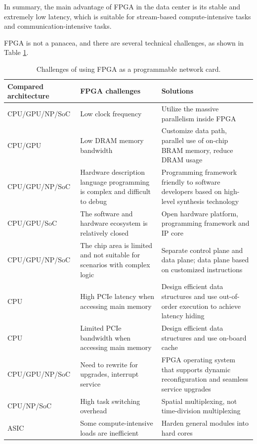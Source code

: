 In summary, the main advantage of FPGA in the data center is its stable and extremely low latency, which is suitable for stream-based compute-intensive tasks and communication-intensive tasks.

FPGA is not a panacea, and there are several technical challenges, as shown in Table \ref{background:tab:fpga-challenges}.

\begin{table}[htbp]
	\centering
	\caption{Challenges of using FPGA as a programmable network card.}
	\small
	\begin{tabular}{l|p{}|p{}}
		\hline
		Compared architecture & FPGA challenges & Solutions \\
		\hline
		\hline
		CPU/GPU/NP/SoC & Low clock frequency & Utilize the massive parallelism inside FPGA \\
		\hline 
		CPU/GPU & Low DRAM memory bandwidth & Customize data path, parallel use of on-chip BRAM memory, reduce DRAM usage \\
		\hline
		CPU/GPU/NP/SoC & Hardware description language programming is complex and difficult to debug & Programming framework friendly to software developers based on high-level synthesis technology \\
		\hline
		CPU/GPU/SoC & The software and hardware ecosystem is relatively closed & Open hardware platform, programming framework and IP core \\
		\hline
		CPU/GPU/NP/SoC & The chip area is limited and not suitable for scenarios with complex logic & Separate control plane and data plane; data plane based on customized instructions \\
		\hline
		CPU & High PCIe latency when accessing main memory & Design efficient data structures and use out-of-order execution to achieve latency hiding \\
		\hline
		CPU & Limited PCIe bandwidth when accessing main memory & Design efficient data structures and use on-board cache \\
		\hline
		CPU/GPU/NP/SoC & Need to rewrite for upgrades, interrupt service & FPGA operating system that supports dynamic reconfiguration and seamless service upgrades \\
		\hline
		CPU/NP/SoC & High task switching overhead & Spatial multiplexing, not time-division multiplexing \\
		\hline
		ASIC & Some compute-intensive loads are inefficient & Harden general modules into hard cores \\
		\hline
	\end{tabular}
	\label{background:tab:fpga-challenges}
\end{table}

